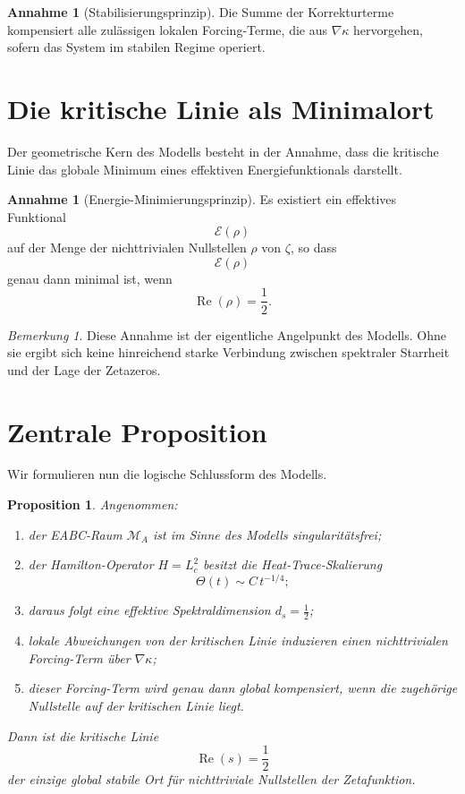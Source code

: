 \documentclass[11pt,a4paper]{article}
\theoremstyle{plain}
\newtheorem{proposition}[satz]{Proposition}
\theoremstyle{definition}
\newtheorem{annahme}[satz]{Annahme}
\theoremstyle{remark}
\newtheorem{bemerkung}[satz]{Bemerkung}
\newcommand{\RePart}{\operatorname{Re}}
\newcommand{\grad}{\nabla}
\newcommand{\MA}{\mathcal{M}_A}
\newcommand{\kappaF}{\kappa}
\newcommand{\ThetaH}{\Theta}
\newcommand{\zetaR}{\zeta}
\begin{document}
	\begin{annahme}[Stabilisierungsprinzip]
		Die Summe der Korrekturterme kompensiert alle zulässigen lokalen Forcing-Terme, die aus $\grad \kappaF$ hervorgehen, sofern das System im stabilen Regime operiert.
	\end{annahme}
	
	\section{Die kritische Linie als Minimalort}
	
	Der geometrische Kern des Modells besteht in der Annahme, dass die kritische Linie das globale Minimum eines effektiven Energiefunktionals darstellt.
	
	\begin{annahme}[Energie-Minimierungsprinzip]
		Es existiert ein effektives Funktional
		\[
		\mathcal{E}(\rho)
		\]
		auf der Menge der nichttrivialen Nullstellen $\rho$ von $\zetaR$, so dass
		\[
		\mathcal{E}(\rho)
		\]
		genau dann minimal ist, wenn
		\[
		\RePart(\rho)=\frac12.
		\]
	\end{annahme}
	
	\begin{bemerkung}
		Diese Annahme ist der eigentliche Angelpunkt des Modells. Ohne sie ergibt sich keine hinreichend starke Verbindung zwischen spektraler Starrheit und der Lage der Zetazeros.
	\end{bemerkung}
	
	\section{Zentrale Proposition}
	
	Wir formulieren nun die logische Schlussform des Modells.
	
	\begin{proposition}
		Angenommen:
		\begin{enumerate}[label=(\roman*)]
			\item der EABC-Raum $\MA$ ist im Sinne des Modells singularitätsfrei;
			\item der Hamilton-Operator $H=L_c^2$ besitzt die Heat-Trace-Skalierung
			\[
			\ThetaH(t)\sim C\,t^{-1/4};
			\]
			\item daraus folgt eine effektive Spektraldimension $d_s=\tfrac12$;
			\item lokale Abweichungen von der kritischen Linie induzieren einen nichttrivialen Forcing-Term über $\grad \kappaF$;
			\item dieser Forcing-Term wird genau dann global kompensiert, wenn die zugehörige Nullstelle auf der kritischen Linie liegt.
		\end{enumerate}
		Dann ist die kritische Linie
		\[
		\RePart(s)=\frac12
		\]
		der einzige global stabile Ort für nichttriviale Nullstellen der Zetafunktion.
	\end{proposition}
	
\end{document}
